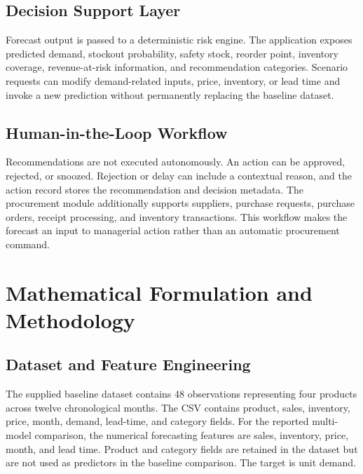 \documentclass[9pt,conference]{IEEEtran}
\providecommand{\syscite}[1]{}
\begin{document}
\subsection{Decision Support Layer}
Forecast output is passed to a deterministic risk engine. \syscite{[cite: 1]} The application exposes predicted demand, stockout probability, safety stock, reorder point, inventory coverage, revenue-at-risk information, and recommendation categories. \syscite{[cite: 1]} Scenario requests can modify demand-related inputs, price, inventory, or lead time and invoke a new prediction without permanently replacing the baseline dataset. \syscite{[cite: 1]}

\subsection{Human-in-the-Loop Workflow}
Recommendations are not executed autonomously. \syscite{[cite: 1]} An action can be approved, rejected, or snoozed. \syscite{[cite: 1]} Rejection or delay can include a contextual reason, and the action record stores the recommendation and decision metadata. \syscite{[cite: 1]} The procurement module additionally supports suppliers, purchase requests, purchase orders, receipt processing, and inventory transactions. \syscite{[cite: 1]} This workflow makes the forecast an input to managerial action rather than an automatic procurement command. \syscite{[cite: 1]}

\section{Mathematical Formulation and Methodology}

\subsection{Dataset and Feature Engineering}
The supplied baseline dataset contains 48 observations representing four products across twelve chronological months. \syscite{[cite: 1]} The CSV contains product, sales, inventory, price, month, demand, lead-time, and category fields. \syscite{[cite: 1]} For the reported multi-model comparison, the numerical forecasting features are sales, inventory, price, month, and lead time. \syscite{[cite: 1]} Product and category fields are retained in the dataset but are not used as predictors in the baseline comparison. \syscite{[cite: 1]} The target is unit demand. \syscite{[cite: 1]}
\end{document}
